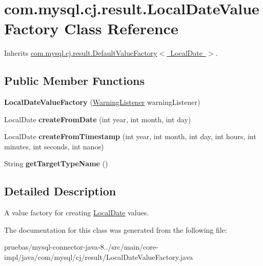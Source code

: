 \hypertarget{classcom_1_1mysql_1_1cj_1_1result_1_1_local_date_value_factory}{}\section{com.\+mysql.\+cj.\+result.\+Local\+Date\+Value\+Factory Class Reference}
\label{classcom_1_1mysql_1_1cj_1_1result_1_1_local_date_value_factory}


Inherits \mbox{\hyperlink{classcom_1_1mysql_1_1cj_1_1result_1_1_default_value_factory}{com.\+mysql.\+cj.\+result.\+Default\+Value\+Factory$<$ Local\+Date $>$}}.

\subsection*{Public Member Functions}
\begin{DoxyCompactItemize}
\item 
\mbox{\label{classcom_1_1mysql_1_1cj_1_1result_1_1_local_date_value_factory_ab6bac9e36517357a2d37267a8df27766}} 
{\bfseries Local\+Date\+Value\+Factory} (\mbox{\hyperlink{interfacecom_1_1mysql_1_1cj_1_1_warning_listener}{Warning\+Listener}} warning\+Listener)
\item 
\mbox{\label{classcom_1_1mysql_1_1cj_1_1result_1_1_local_date_value_factory_af0460a8c155945d8f2ab4eca9ca758af}} 
Local\+Date {\bfseries create\+From\+Date} (int year, int month, int day)
\item 
\mbox{\label{classcom_1_1mysql_1_1cj_1_1result_1_1_local_date_value_factory_af50202396d13dee7c69c2d92f2c1b80f}} 
Local\+Date {\bfseries create\+From\+Timestamp} (int year, int month, int day, int hours, int minutes, int seconds, int nanos)
\item 
\mbox{\label{classcom_1_1mysql_1_1cj_1_1result_1_1_local_date_value_factory_af5c369a382c0adc08ed7e768c5041dc5}} 
String {\bfseries get\+Target\+Type\+Name} ()
\end{DoxyCompactItemize}


\subsection{Detailed Description}
A value factory for creating \mbox{\hyperlink{}{Local\+Date}} values. 

The documentation for this class was generated from the following file\+:\begin{DoxyCompactItemize}
\item 
pruebas/mysql-\/connector-\/java-\/8../src/main/core-\/impl/java/com/mysql/cj/result/Local\+Date\+Value\+Factory.\+java\end{DoxyCompactItemize}
